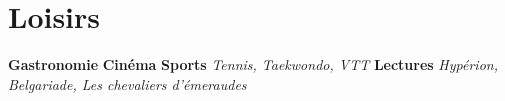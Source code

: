 \documentclass[letterpaper,10pt]{article}
\begin{document}
  


  \section{Loisirs}
    \hspace{10pt}\textbf{Gastronomie}
    \hfill\textbf{Cinéma}
    \hfill\textbf{Sports} \textit{Tennis, Taekwondo, VTT}
    \hfill\textbf{Lectures} \textit{Hypérion, Belgariade, Les chevaliers d'émeraudes}



%   

\end{document}

